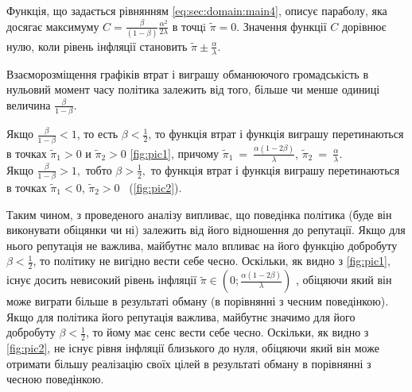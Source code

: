 Функція, що задається рівнянням \eqref{eq:sec:domain:main4}, описує параболу,
яка досягає максимуму $C=\frac{\beta}{(1-\beta)}\frac{\alpha^2}{2\lambda} $  в
точцi   $\tilde{\pi}=0$. Значення функції $C$ дорівнює нулю, коли рівень
інфляції становить $\tilde{\pi}\pm\frac{\alpha}{\lambda}$.


Взаєморозміщення графіків втрат і виграшу обманюючого громадськість в нульовий момент часу політика залежить від того, більше чи менше одиниці величина $\frac{\beta}{1-\beta}$.

Якщо   $\frac{\beta}{1-\beta}<1$, то есть  $\beta<\frac{1}{2}$, то функція втрат і функція виграшу перетинаються в точках  $\tilde{\pi}_1>0$ и $\tilde{\pi}_2>0$ \eqref{fig:pic1}, причому  $\tilde{\pi}_1~=~\frac{\alpha(1-2\beta)}{\lambda}$, $\tilde{\pi}_2~=~\frac{\alpha}{\lambda}$. \\
Якщо  $\frac{\beta}{1-\beta}>1,$  тобто  $\beta>\frac{1}{2},$  то функція втрат і функція виграшу перетинаються в точках $\tilde{\pi}_1<0$, $\tilde{\pi}_2>0$ ~(\ref{fig:pic2}).

Таким чином, з проведеного аналізу випливає, що поведінка політика (буде він виконувати обіцянки чи ні) залежить від його відношення до репутації. Якщо для нього репутація не важлива, майбутнє мало впливає на його функцію добробуту $\beta<\frac{1}{2}$, то політику не вигідно вести себе чесно. Оскільки, як видно з \eqref{fig:pic1}, існує досить невисокий рівень інфляції $\tilde{\pi}\in\left(0;\frac{\alpha(1-2\beta)}{\lambda} \right)$ , обіцяючи який він може виграти більше в результаті обману (в порівнянні з чесним поведінкою). Якщо для політика його репутація важлива, майбутнє значимо для його добробуту $\beta<\frac{1}{2}$, то йому має сенс вести себе чесно. Оскільки, як видно з \eqref{fig:pic2}, не існує рівня інфляції близького до нуля, обіцяючи який він може отримати більшу реалізацію своїх цілей в результаті обману в порівнянні з чесною поведінкою.
